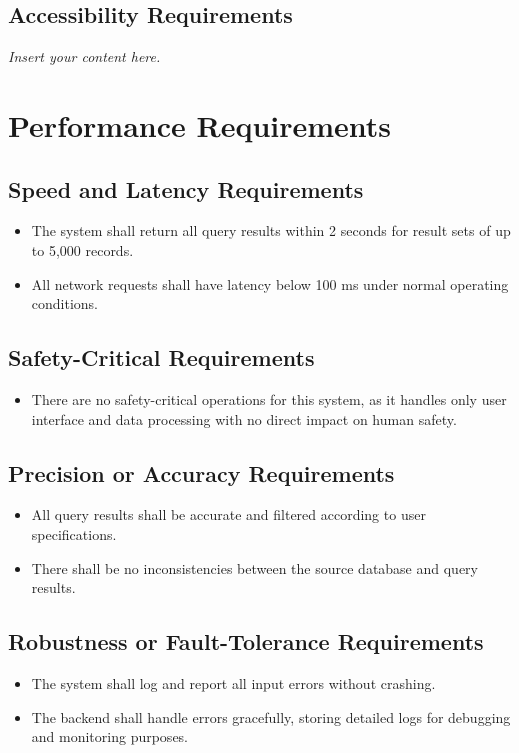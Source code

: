 \documentclass[12pt]{article}
\newcommand{\lips}{\textit{Insert your content here.}}
\begin{document}
\subsection{Accessibility Requirements}
\lips

\section{Performance Requirements}

\subsection{Speed and Latency Requirements}
\begin{itemize}
    \item The system shall return all query results within 2 seconds for result sets of up to 5,000 records.
    \item All network requests shall have latency below 100 ms under normal operating conditions.
\end{itemize}

\subsection{Safety-Critical Requirements}
\begin{itemize}
    \item There are no safety-critical operations for this system, as it handles only user interface and data processing with no direct impact on human safety.
\end{itemize}

\subsection{Precision or Accuracy Requirements}
\begin{itemize}
    \item All query results shall be accurate and filtered according to user specifications.
    \item There shall be no inconsistencies between the source database and query results.
\end{itemize}

\subsection{Robustness or Fault-Tolerance Requirements}
\begin{itemize}
    \item The system shall log and report all input errors without crashing.
    \item The backend shall handle errors gracefully, storing detailed logs for debugging and monitoring purposes.
\end{itemize}
\end{document}
